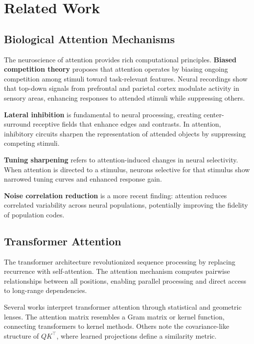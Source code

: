 \section{Related Work}

\subsection{Biological Attention Mechanisms}

The neuroscience of attention provides rich computational principles. \textbf{Biased competition theory} \cite{desimone1995neural} proposes that attention operates by biasing ongoing competition among stimuli toward task-relevant features. Neural recordings show that top-down signals from prefrontal and parietal cortex modulate activity in sensory areas, enhancing responses to attended stimuli while suppressing others.

\textbf{Lateral inhibition} is fundamental to neural processing, creating center-surround receptive fields that enhance edges and contrasts. In attention, inhibitory circuits sharpen the representation of attended objects by suppressing competing stimuli.

\textbf{Tuning sharpening} refers to attention-induced changes in neural selectivity. When attention is directed to a stimulus, neurons selective for that stimulus show narrowed tuning curves and enhanced response gain.

\textbf{Noise correlation reduction} is a more recent finding: attention reduces correlated variability across neural populations, potentially improving the fidelity of population codes.

\subsection{Transformer Attention}

The transformer architecture \cite{vaswani2017attention} revolutionized sequence processing by replacing recurrence with self-attention. The attention mechanism computes pairwise relationships between all positions, enabling parallel processing and direct access to long-range dependencies.

Several works interpret transformer attention through statistical and geometric lenses. The attention matrix resembles a Gram matrix or kernel function, connecting transformers to kernel methods. Others note the covariance-like structure of $QK^\top$, where learned projections define a similarity metric.

